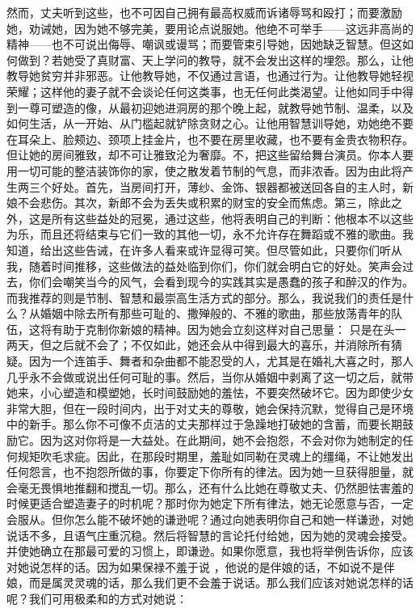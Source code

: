 然而，丈夫听到这些，也不可因自己拥有最高权威而诉诸辱骂和殴打；而要激励她，劝诫她，因为她不够完美，要用论点说服她。他绝不可举手——这远非高尚的精神——也不可说出侮辱、嘲讽或谩骂；而要管束引导她，因她缺乏智慧。但这如何做到？若她受了真财富、天上学问的教导，就不会发出这样的埋怨。那么，让他教导她贫穷并非邪恶。让他教导她，不仅通过言语，也通过行为。让他教导她轻视荣耀；这样他的妻子就不会谈论任何这类事，也无任何此类渴望。让他如同手中得到一尊可塑造的像，从最初迎她进洞房的那个晚上起，就教导她节制、温柔，以及如何生活，从一开始、从门槛起就铲除贪财之心。让他用智慧训导她，劝她绝不要在耳朵上、脸颊边、颈项上挂金片，也不要在房里收藏，也不要有金贵衣物积存。但让她的房间雅致，却不可让雅致沦为奢靡。不，把这些留给舞台演员。你本人要用一切可能的整洁装饰你的家，使之散发着节制的气息，而非浓香。因为由此将产生两三个好处。首先，当房间打开，薄纱、金饰、银器都被送回各自的主人时，新娘不会悲伤。其次，新郎不会为丢失或积累的财宝的安全而焦虑。第三，除此之外，这是所有这些益处的冠冕，通过这些，他将表明自己的判断：他根本不以这些为乐，而且还将结束与它们一致的其他一切，永不允许存在舞蹈或不雅的歌曲。我知道，给出这些告诫，在许多人看来或许显得可笑。但尽管如此，只要你们听从我，随着时间推移，这些做法的益处临到你们，你们就会明白它的好处。笑声会过去，你们会嘲笑当今的风气，会看到现今的实践其实是愚蠢的孩子和醉汉的作为。而我推荐的则是节制、智慧和最崇高生活方式的部分。那么，我说我们的责任是什么？从婚姻中除去所有那些可耻的、撒殚般的、不雅的歌曲，那些放荡青年的队伍，这将有助于克制你新娘的精神。因为她会立刻这样对自己思量：  只是在头一两天，但之后就不会了；不仅如此，她还会从中得到最大的喜乐，并消除所有猜疑。因为一个连笛手、舞者和杂曲都不能忍受的人，尤其是在婚礼大喜之时，那人几乎永不会做或说出任何可耻的事。然后，当你从婚姻中剥离了这一切之后，就带她来，小心塑造和模塑她，长时间鼓励她的羞怯，不要突然破坏它。因为即使少女非常大胆，但在一段时间内，出于对丈夫的尊敬，她会保持沉默，觉得自己是环境中的新手。那么你不可像不贞洁的丈夫那样过于急躁地打破她的含蓄，而要长期鼓励它。因为这对你将是一大益处。在此期间，她不会抱怨，不会对你为她制定的任何规矩吹毛求疵。因此，在那段时期里，羞耻如同勒在灵魂上的缰绳，不让她发出任何怨言，也不抱怨所做的事，你要定下你所有的律法。因为她一旦获得胆量，就会毫无畏惧地推翻和搅乱一切。那么，还有什么比她在尊敬丈夫、仍然胆怯害羞的时候更适合塑造妻子的时机呢？那时你为她定下所有律法，她无论愿意与否，一定会服从。但你怎么能不破坏她的谦逊呢？通过向她表明你自己和她一样谦逊，对她说话不多，且语气庄重沉稳。然后将智慧的言论托付给她，因为她的灵魂会接受。并使她确立在那最可爱的习惯上，即谦逊。如果你愿意，我也将举例告诉你，应该对她说怎样的话。因为如果保禄不羞于说 ，他说的是伴娘的话，不如说不是伴娘，而是属灵灵魂的话，那么我们更不会羞于说话。那么我们应该对她说怎样的话呢？我们可用极柔和的方式对她说： 